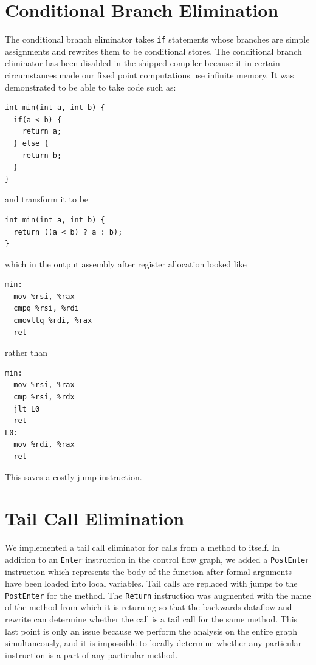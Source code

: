 \documentclass[11pt]{article}
\begin{document}

\section {Conditional Branch Elimination} 
\label{sec:condelim}

The conditional branch eliminator takes \texttt{if} statements whose
branches are simple assignments and rewrites them to be conditional
stores.  The conditional branch eliminator has been disabled in the
shipped compiler because it in certain circumstances made our fixed
point computations use infinite memory.  It was demonstrated to be
able to take code such as:
\begin{verbatim}
int min(int a, int b) {
  if(a < b) {
    return a;
  } else {
    return b;
  }
}
\end{verbatim}
and transform it to be
\begin{verbatim}
int min(int a, int b) {
  return ((a < b) ? a : b);
}
\end{verbatim}
which in the output assembly after register allocation looked like
\begin{verbatim}
min:
  mov %rsi, %rax
  cmpq %rsi, %rdi
  cmovltq %rdi, %rax
  ret
\end{verbatim}
rather than
\begin{verbatim}
min:
  mov %rsi, %rax
  cmp %rsi, %rdx
  jlt L0
  ret
L0:
  mov %rdi, %rax
  ret
\end{verbatim}

This saves a costly jump instruction.

\section{Tail Call Elimination}
\label{sec:tailcall}

We implemented a tail call eliminator for calls from a method to
itself.  In addition to an \texttt{Enter} instruction in the control
flow graph, we added a \texttt{PostEnter} instruction which represents
the body of the function after formal arguments have been loaded into
local variables.  Tail calls are replaced with jumps to the
\texttt{PostEnter} for the method.  The \texttt{Return} instruction
was augmented with the name of the method from which it is returning
so that the backwards dataflow and rewrite can determine whether the
call is a tail call for the same method.  This last point is only an
issue because we perform the analysis on the entire graph
simultaneously, and it is impossible to locally determine whether any
particular instruction is a part of any particular method.
\end{document}
